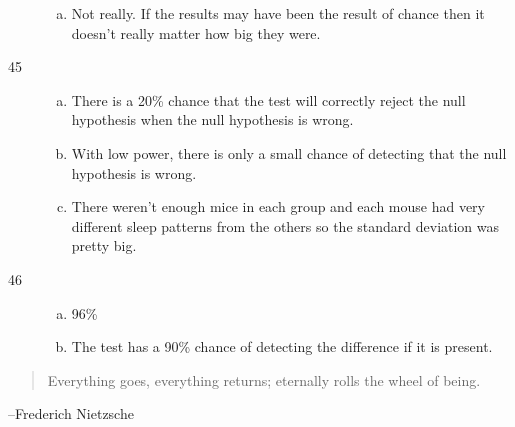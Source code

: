 \documentclass[letterpaper, landscape]{exam}
\begin{document}
\begin{description}
\begin{enumerate}[(a)]
          \item Not really. If the results may have been the result of chance
            then it doesn't really matter how big they were.
        \end{enumerate}

      \item[45]
        \begin{enumerate}[(a)]
          \item There is a 20\% chance that the test will correctly reject the
            null hypothesis when the null hypothesis is wrong.

          \item With low power, there is only a small chance of detecting that
            the null hypothesis is wrong.

          \item There weren't enough mice in each group and each mouse had very
            different sleep patterns from the others so the standard deviation
            was pretty big.

        \end{enumerate}

      \item[46]
        \begin{enumerate}[(a)]
          \item 96\%

          \item The test has a 90\% chance of detecting the difference if it is
            present.
        \end{enumerate}

  \end{description}

  \else
    \vspace{12 cm}
    \begin{quote}
      \begin{em}
        Everything goes, everything returns; eternally rolls the wheel of
        being.
      \end{em}
    \end{quote}
    \hspace{1 cm}--Frederich Nietzsche
  \fi
\end{document}
